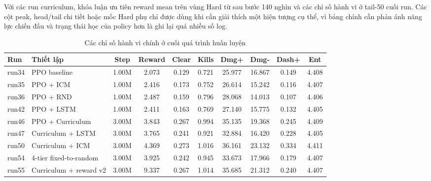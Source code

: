 Với các run curriculum, khóa luận ưu tiên reward mean trên vùng Hard từ sau bước 140 nghìn và các chỉ số hành vi ở tail-50 cuối run. Các cột peak, head/tail chi tiết hoặc mốc Hard phụ chỉ được dùng khi cần giải thích một hiện tượng cụ thể, vì bảng chính cần phản ánh năng lực chiến đấu và trạng thái học của policy hơn là ghi lại quá nhiều số log.

\begin{table}[H]
    \centering
    \scriptsize
    \setlength{\tabcolsep}{4pt}
    \renewcommand{\arraystretch}{1.15}
    \caption{Các chỉ số hành vi chính ở cuối quá trình huấn luyện}
    \label{tab:run_metrics_main}
    \begin{tabular}{l p{3.0cm} c c c c c c c c}
        \toprule
        \textbf{Run} & \textbf{Thiết lập} & \textbf{Step} & \textbf{Reward} & \textbf{Clear} & \textbf{Kills} & \textbf{Dmg+} & \textbf{Dmg-} & \textbf{Dash+} & \textbf{Ent} \\
        \midrule
        run34 & PPO baseline & 1.00M & 2.073 & 0.129 & 0.721 & 25.977 & 16.867 & 0.149 & 4.408 \\
        run35 & PPO + ICM & 1.00M & 2.416 & 0.173 & 0.752 & 26.614 & 15.242 & 0.116 & 4.407 \\
        run36 & PPO + RND & 1.00M & 2.487 & 0.159 & 0.796 & 28.068 & 14.013 & 0.107 & 4.406 \\
        run42 & PPO + LSTM & 1.00M & 2.411 & 0.163 & 0.769 & 27.140 & 15.775 & 0.132 & 4.405 \\
        run46 & PPO + Curriculum & 3.00M & 3.843 & 0.267 & 0.994 & 35.135 & 19.368 & 0.245 & 4.409 \\
        run47 & Curriculum + LSTM & 3.00M & 3.765 & 0.241 & 0.921 & 32.884 & 16.420 & 0.228 & 4.405 \\
        run50 & Curriculum + ICM & 3.00M & 4.369 & 0.273 & 1.016 & 36.161 & 23.132 & 0.334 & 4.411 \\
        run54 & 4-tier fixed-to-random & 3.00M & 3.925 & 0.242 & 0.945 & 33.673 & 17.966 & 0.179 & 4.407 \\
        run55 & Curriculum + reward v2 & 3.00M & 9.337 & 0.267 & 1.014 & 35.685 & 21.312 & 0.240 & 4.407 \\
        \bottomrule
    \end{tabular}
\end{table}

